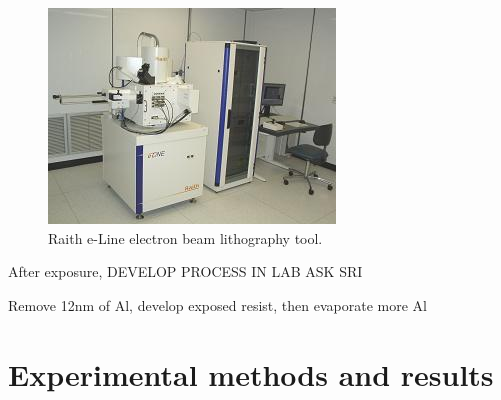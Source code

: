 \documentclass[11 pt, oneside]{book} %
\begin{document}
\begin{figure}[h] 
   \centering
   \includegraphics[width=3in]{RaitheLine.jpg} 
   \caption[Raith e-Line]{Raith e-Line electron beam lithography tool.}
   \label{fig:Raith}
\end{figure}

After exposure, DEVELOP PROCESS IN LAB ASK SRI


Remove 12nm of Al, develop exposed resist, then evaporate more Al


\chapter{Experimental methods and results}\label{chap:Experimental}


\newpage



\end{document}
